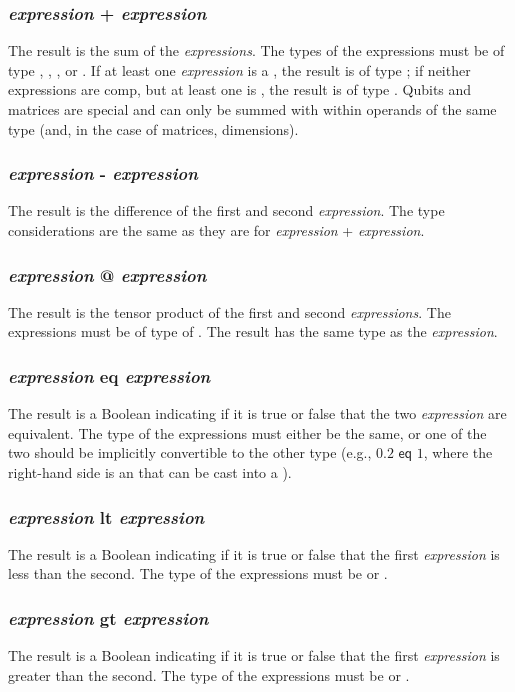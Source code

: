 \subsubsection{\textit{expression} + \textit{expression}}
The result is the sum of the \textit{expressions}. The types of the expressions must be of type \integ, \float, \complex, or \mat. If at least one \textit{expression} is a \complex, the result is of type \complex; if neither expressions are comp, but at least one is \float, the result is of type \float. Qubits and matrices are special and can only be summed with within operands of the same type (and, in the case of matrices, dimensions).
\subsubsection{\textit{expression} - \textit{expression}}
The result is the difference of the first and second \textit{expression}. The type considerations are the same as they are for \textit{expression} + \textit{expression}.
\subsubsection{\textit{expression} @ \textit{expression}}
The result is the tensor product of the first and second \textit{expressions}. The expressions must be of type of \mat. The result has the same type as the \textit{expression}.
\subsubsection{\textit{expression} eq \textit{expression}}
The result is a Boolean indicating if it is true or false that the two \textit{expression} are equivalent. The type of the expressions must either be the same, or one of the two should be implicitly convertible to the other type (e.g., $0.2 \textsf{ eq } 1$, where the right-hand side is an \integ that can be cast into a \float).
\subsubsection{\textit{expression} lt \textit{expression}}
The result is a Boolean indicating if it is true or false that the first \textit{expression} is less than the second. The type of the expressions must be \integ or \float.%
\subsubsection{\textit{expression} gt \textit{expression}}
The result is a Boolean indicating if it is true or false that the first \textit{expression} is greater than the second. The type of the expressions must be \integ or \float.%
